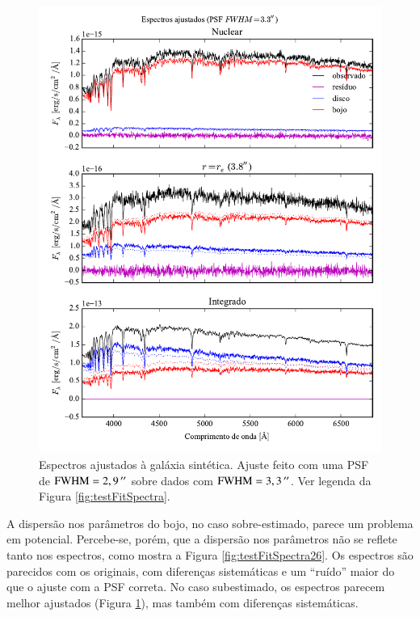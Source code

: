 \begin{figure}
	\includegraphics{figuras/simulation_spectra_psf33}
	\caption[Espectros ajustados (teste com PSF $\mathrm{FWHM} = 3,3\,\arcs$)]
	{Espectros ajustados à galáxia sintética. Ajuste feito com uma PSF de
	$\mathrm{FWHM} = 2,9\,^{\prime\prime}$ sobre dados com $\mathrm{FWHM} = 3,3\,\arcs$. Ver
	legenda da Figura \ref{fig:testFitSpectra}.} \label{fig:testFitSpectra33}
\end{figure}

A dispersão nos parâmetros do bojo, no caso sobre-estimado, parece um problema
em potencial. Percebe-se, porém, que a dispersão nos parâmetros não se reflete
tanto nos espectros, como mostra a Figura \ref{fig:testFitSpectra26}. Os
espectros são parecidos com os originais, com diferenças sistemáticas e um
``ruído'' maior do que o ajuste com a PSF correta. No caso subestimado, os
espectros parecem melhor ajustados (Figura \ref{fig:testFitSpectra33}), mas
também com diferenças sistemáticas.

